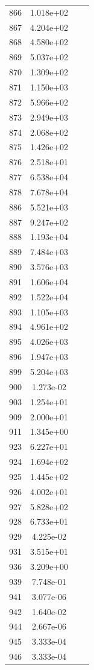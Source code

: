\documentclass[12pt]{article}
\begin{document}
\begin{longtable}{@{}cccc@{}}
866 & 1.018e+02 &  &  \\
867 & 4.204e+02 &  &  \\
868 & 4.580e+02 &  &  \\
869 & 5.037e+02 &  &  \\
870 & 1.309e+02 &  &  \\
871 & 1.150e+03 &  &  \\
872 & 5.966e+02 &  &  \\
873 & 2.949e+03 &  &  \\
874 & 2.068e+02 &  &  \\
875 & 1.426e+02 &  &  \\
876 & 2.518e+01 &  &  \\
877 & 6.538e+04 &  &  \\
878 & 7.678e+04 &  &  \\
886 & 5.521e+03 &  &  \\
887 & 9.247e+02 &  &  \\
888 & 1.193e+04 &  &  \\
889 & 7.484e+03 &  &  \\
890 & 3.576e+03 &  &  \\
891 & 1.606e+04 &  &  \\
892 & 1.522e+04 &  &  \\
893 & 1.105e+03 &  &  \\
894 & 4.961e+02 &  &  \\
895 & 4.026e+03 &  &  \\
896 & 1.947e+03 &  &  \\
899 & 5.204e+03 &  &  \\
900 & 1.273e-02 &  &  \\
903 & 1.254e+01 &  &  \\
909 & 2.000e+01 &  &  \\
911 & 1.345e+00 &  &  \\
923 & 6.227e+01 &  &  \\
924 & 1.694e+02 &  &  \\
925 & 1.445e+02 &  &  \\
926 & 4.002e+01 &  &  \\
927 & 5.828e+02 &  &  \\
928 & 6.733e+01 &  &  \\
929 & 4.225e-02 &  &  \\
931 & 3.515e+01 &  &  \\
936 & 3.209e+00 &  &  \\
939 & 7.748e-01 &  &  \\
941 & 3.077e-06 &  &  \\
942 & 1.640e-02 &  &  \\
944 & 2.667e-06 &  &  \\
945 & 3.333e-04 &  &  \\
946 & 3.333e-04 &  &  \\

\bottomrule
\end{longtable}
\end{document}
